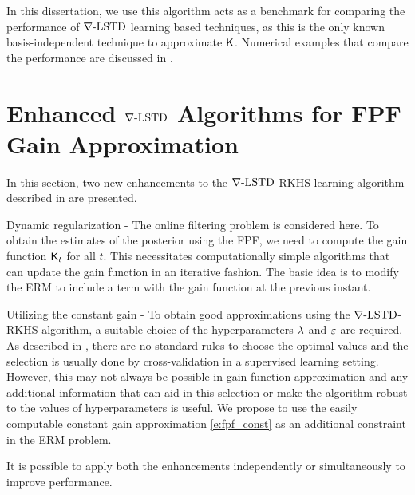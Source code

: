In this dissertation, we use this algorithm acts as a benchmark for comparing the performance of $\nabla\text{-LSTD}$ learning based techniques, as this is the only known basis-independent technique to approximate $\text{\sf K}$. Numerical examples that compare the performance are discussed in .


\section{Enhanced $\nabla\text{-LSTD}$ Algorithms for FPF Gain Approximation} 
\label{s:fpf_rkhs_improvements}
In this section, two new enhancements to the $\nabla\text{-LSTD}$-RKHS learning algorithm described in  are presented. 
\begin{romannum}
\item Dynamic regularization - The online filtering problem is considered here. To obtain the estimates of the posterior using the FPF, we need to compute the gain function $\text{\sf K}_t$ for all $t$. This necessitates computationally simple algorithms that can update the gain function in an iterative fashion. The basic idea is to modify the ERM to include a term with the gain function at the previous instant.
\item Utilizing the constant gain - To obtain good approximations using the $\nabla\text{-LSTD}$-RKHS algorithm, a suitable choice of the hyperparameters $\lambda$ and $\varepsilon$ are required. As described in , there are no standard rules to choose the optimal values and the selection is usually done by cross-validation in a supervised learning setting. However, this may not always be possible in gain function approximation and any additional information that can aid in this selection or make the algorithm robust to the values of hyperparameters is useful. We propose to use the easily computable constant gain approximation \eqref{e:fpf_const} as an additional constraint in the ERM problem. 
\end{romannum}
It is possible to apply both the enhancements independently or simultaneously to improve performance. 

